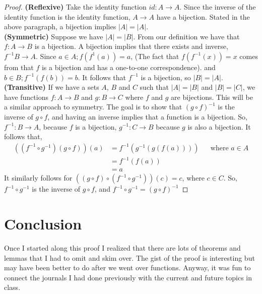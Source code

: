 \documentclass{article}
\begin{document}
\begin{proof}
  \textbf{(Reflexive)} Take the identity function $id : A \to A$. Since the inverse of the identity function is the identity function, $A \to A$ have a bijection. Stated in the above paragraph, a bijection implies $|A| = |A|$.\\
  \textbf{(Symmetric)} Suppose we have $|A| = |B|$. From our definition we have that $f : A \to B$ is a bijection. A bijection implies that there exists and inverse, $f^{-1} B \to A$. Since $a \in A; f(f^{1}(a)) = a$, (The fact that $f(f^{-1}(x)) = x$ comes from that $f$ is a bijection and has a one-to-one correspondence). and $b \in B; f^{-1}(f(b)) = b$. It follows that $f^{-1}$ is a bijection, so $|B| = |A|$.\\
  \textbf{(Transitive)} If we have a sets $A$, $B$ and $C$ such that $|A| = |B|$ and $|B| = |C|$, we have functions $f : A \to B$ and $g: B \to C$ where $f$ and $g$ are bijections. This will be a similar approach to symmetry. The goal is to show that $(g \circ f)^{-1}$ is the inverse of $g \circ f$, and having an inverse implies that a function is a bijection. So, $f^{-1} : B \to A$, because $f$ is a bijection, $g^{-1} : C \to B$ because $g$ is also a bijection. It follows that, 
  \begin{align*}
    ((f^{-1} \circ g^{-1}) (g \circ f)) (a) &= f^{-1}(g^{-1}(g(f(a)))) && \text{where }a \in A\\
    &= f^{-1}(f(a))\\
    &= a
  \end{align*}
  It similarly follows for $((g \circ f) \circ (f^{-1} \circ g^{-1})) (c) = c$, where $c \in C$. So, $f^{-1} \circ g^{-1}$ is the inverse of $g \circ f$, and $f^{-1} \circ g^{-1} = (g \circ f)^{-1}$
\end{proof}

\section*{Conclusion}
Once I started along this proof I realized that there are lots of theorems and lemmas that I had to omit and skim over. The gist of the proof is interesting but may have been better to do after we went over functions. Anyway, it was fun to connect the journals I had done previously with the current and future topics in class.
\end{document}
